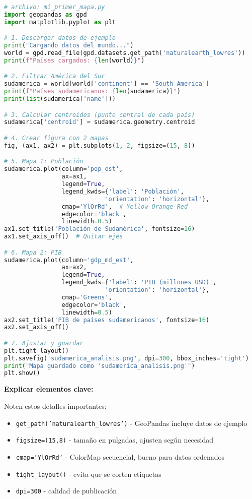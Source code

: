 \documentclass[11pt,a4paper]{article}
\newcommand{\decir}[1]{\begin{tcolorbox}[colback=blue!5,colframe=usachblue,title={\faIcon{microphone} DECIR}]#1\end{tcolorbox}}
\begin{document}
\begin{lstlisting}[language=Python, title=mi primer mapa.py]
# archivo: mi_primer_mapa.py
import geopandas as gpd
import matplotlib.pyplot as plt

# 1. Descargar datos de ejemplo
print("Cargando datos del mundo...")
world = gpd.read_file(gpd.datasets.get_path('naturalearth_lowres'))
print(f"Países cargados: {len(world)}")

# 2. Filtrar América del Sur
sudamerica = world[world['continent'] == 'South America']
print(f"Países sudamericanos: {len(sudamerica)}")
print(list(sudamerica['name']))

# 3. Calcular centroides (punto central de cada país)
sudamerica['centroid'] = sudamerica.geometry.centroid

# 4. Crear figura con 2 mapas
fig, (ax1, ax2) = plt.subplots(1, 2, figsize=(15, 8))

# 5. Mapa 1: Población
sudamerica.plot(column='pop_est', 
                ax=ax1, 
                legend=True,
                legend_kwds={'label': 'Población',
                            'orientation': 'horizontal'},
                cmap='YlOrRd',  # Yellow-Orange-Red
                edgecolor='black',
                linewidth=0.5)
ax1.set_title('Población de Sudamérica', fontsize=16)
ax1.set_axis_off()  # Quitar ejes

# 6. Mapa 2: PIB
sudamerica.plot(column='gdp_md_est',
                ax=ax2,
                legend=True,
                legend_kwds={'label': 'PIB (millones USD)',
                            'orientation': 'horizontal'}, 
                cmap='Greens',
                edgecolor='black',
                linewidth=0.5)
ax2.set_title('PIB de países sudamericanos', fontsize=16)
ax2.set_axis_off()

# 7. Ajustar y guardar
plt.tight_layout()
plt.savefig('sudamerica_analisis.png', dpi=300, bbox_inches='tight')
print("Mapa guardado como 'sudamerica_analisis.png'")
plt.show()
\end{lstlisting}

\textbf{Explicar elementos clave:}

\decir{
Noten estos detalles importantes:
\begin{itemize}
    \item \texttt{get\_path('naturalearth\_lowres')} - GeoPandas incluye datos de ejemplo
    \item \texttt{figsize=(15,8)} - tamaño en pulgadas, ajusten según necesidad
    \item \texttt{cmap='YlOrRd'} - ColorMap secuencial, bueno para datos ordenados
    \item \texttt{tight\_layout()} - evita que se corten etiquetas
    \item \texttt{dpi=300} - calidad de publicación
\end{itemize}
}
\end{document}
